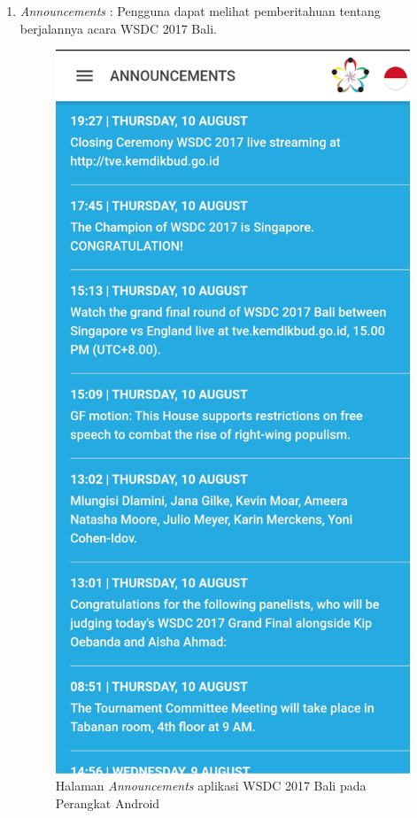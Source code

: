 \begin{enumerate}
	\item {\it Announcements} : Pengguna dapat melihat pemberitahuan tentang berjalannya acara WSDC 2017 Bali.

	\begin{figure}[H]
	    \centering
	    \includegraphics[scale=0.12]{Gambar/Announcements.jpg}
	    \caption{Halaman {\it Announcements} aplikasi WSDC 2017 Bali pada Perangkat Android}
	    \label{fig:wsdcappannouncements}
	\end{figure}


\end{enumerate}
